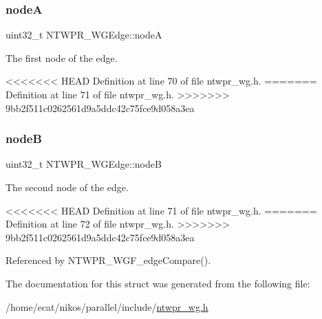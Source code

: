 \subsubsection{\texorpdfstring{nodeA}{nodeA}}
{\footnotesize\ttfamily uint32\+\_\+t N\+T\+W\+P\+R\+\_\+\+W\+G\+Edge\+::nodeA}

The first node of the edge. 

<<<<<<< HEAD
Definition at line 70 of file ntwpr\+\_\+wg.\+h.
=======
Definition at line 71 of file ntwpr\+\_\+wg.\+h.
>>>>>>> 9bb2f511c0262561d9a5ddc42c75fce9d058a3ea

\mbox{\label{structNTWPR__WGEdge_a0f9b43039574824cc76908125ad3661d}} 
\subsubsection{\texorpdfstring{nodeB}{nodeB}}
{\footnotesize\ttfamily uint32\+\_\+t N\+T\+W\+P\+R\+\_\+\+W\+G\+Edge\+::nodeB}

The second node of the edge. 

<<<<<<< HEAD
Definition at line 71 of file ntwpr\+\_\+wg.\+h.
=======
Definition at line 72 of file ntwpr\+\_\+wg.\+h.
>>>>>>> 9bb2f511c0262561d9a5ddc42c75fce9d058a3ea



Referenced by N\+T\+W\+P\+R\+\_\+\+W\+G\+F\+\_\+edge\+Compare().



The documentation for this struct was generated from the following file\+:\begin{DoxyCompactItemize}
\item 
/home/ecat/nikos/parallel/include/\mbox{\hyperlink{ntwpr__wg_8h}{ntwpr\+\_\+wg.\+h}}\end{DoxyCompactItemize}
